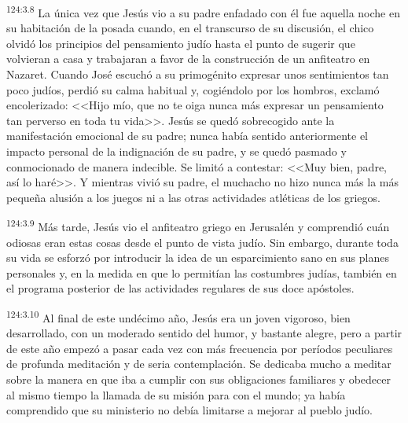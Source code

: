 \par 
\textsuperscript{124:3.8} La única vez que Jesús vio a su padre enfadado con él fue aquella noche en su habitación de la posada cuando, en el transcurso de su discusión, el chico olvidó los principios del pensamiento judío hasta el punto de sugerir que volvieran a casa y trabajaran a favor de la construcción de un anfiteatro en Nazaret. Cuando José escuchó a su primogénito expresar unos sentimientos tan poco judíos, perdió su calma habitual y, cogiéndolo por los hombros, exclamó encolerizado: <<Hijo mío, que no te oiga nunca más expresar un pensamiento tan perverso en toda tu vida>>. Jesús se quedó sobrecogido ante la manifestación emocional de su padre; nunca había sentido anteriormente el impacto personal de la indignación de su padre, y se quedó pasmado y conmocionado de manera indecible. Se limitó a contestar: <<Muy bien, padre, así lo haré>>. Y mientras vivió su padre, el muchacho no hizo nunca más la más pequeña alusión a los juegos ni a las otras actividades atléticas de los griegos.

\par 
\textsuperscript{124:3.9} Más tarde, Jesús vio el anfiteatro griego en Jerusalén y comprendió cuán odiosas eran estas cosas desde el punto de vista judío. Sin embargo, durante toda su vida se esforzó por introducir la idea de un esparcimiento sano en sus planes personales y, en la medida en que lo permitían las costumbres judías, también en el programa posterior de las actividades regulares de sus doce apóstoles.

\par 
\textsuperscript{124:3.10} Al final de este undécimo año, Jesús era un joven vigoroso, bien desarrollado, con un moderado sentido del humor, y bastante alegre, pero a partir de este año empezó a pasar cada vez con más frecuencia por períodos peculiares de profunda meditación y de seria contemplación. Se dedicaba mucho a meditar sobre la manera en que iba a cumplir con sus obligaciones familiares y obedecer al mismo tiempo la llamada de su misión para con el mundo; ya había comprendido que su ministerio no debía limitarse a mejorar al pueblo judío.

